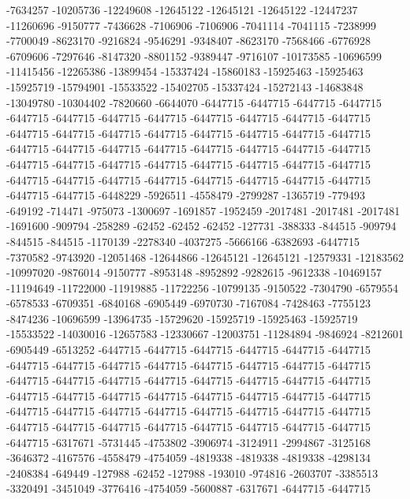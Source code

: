 -7634257 -10205736 -12249608 -12645122 -12645121 -12645122 -12447237 -11260696 -9150777 -7436628 -7106906 -7106906 -7041114 -7041115 -7238999 -7700049 -8623170 -9216824 -9546291 -9348407 -8623170 -7568466 -6776928 -6709606 -7297646 -8147320 -8801152 -9389447 -9716107 -10173585 -10696599 -11415456 -12265386 -13899454 -15337424 -15860183 -15925463 -15925463 -15925719 -15794901 -15533522 -15402705 -15337424 -15272143 -14683848 -13049780 -10304402 -7820660 -6644070 -6447715 -6447715 -6447715 -6447715 -6447715 -6447715 -6447715 -6447715 -6447715 -6447715 -6447715 -6447715 -6447715 -6447715 -6447715 -6447715 -6447715 -6447715 -6447715 -6447715 -6447715 -6447715 -6447715 -6447715 -6447715 -6447715 -6447715 -6447715 -6447715 -6447715 -6447715 -6447715 -6447715 -6447715 -6447715 -6447715 -6447715 -6447715 -6447715 -6447715 -6447715 -6447715 -6447715 -6447715 -6447715 -6447715 -6448229 -5926511 -4558479 -2799287 -1365719 -779493 -649192 -714471 -975073 -1300697 -1691857 -1952459 -2017481 -2017481 -2017481 -1691600 -909794 -258289 -62452 -62452 -62452 -127731 -388333 -844515 -909794 -844515 -844515 -1170139 -2278340 -4037275 -5666166 -6382693 -6447715
-7370582 -9743920 -12051468 -12644866 -12645121 -12645121 -12579331 -12183562 -10997020 -9876014 -9150777 -8953148 -8952892 -9282615 -9612338 -10469157 -11194649 -11722000 -11919885 -11722256 -10799135 -9150522 -7304790 -6579554 -6578533 -6709351 -6840168 -6905449 -6970730 -7167084 -7428463 -7755123 -8474236 -10696599 -13964735 -15729620 -15925719 -15925463 -15925719 -15533522 -14030016 -12657583 -12330667 -12003751 -11284894 -9846924 -8212601 -6905449 -6513252 -6447715 -6447715 -6447715 -6447715 -6447715 -6447715 -6447715 -6447715 -6447715 -6447715 -6447715 -6447715 -6447715 -6447715 -6447715 -6447715 -6447715 -6447715 -6447715 -6447715 -6447715 -6447715 -6447715 -6447715 -6447715 -6447715 -6447715 -6447715 -6447715 -6447715 -6447715 -6447715 -6447715 -6447715 -6447715 -6447715 -6447715 -6447715 -6447715 -6447715 -6447715 -6447715 -6447715 -6447715 -6447715 -6447715 -6447715 -6317671 -5731445 -4753802 -3906974 -3124911 -2994867 -3125168 -3646372 -4167576 -4558479 -4754059 -4819338 -4819338 -4819338 -4298134 -2408384 -649449 -127988 -62452 -127988 -193010 -974816 -2603707 -3385513 -3320491 -3451049 -3776416 -4754059 -5600887 -6317671 -6447715 -6447715
